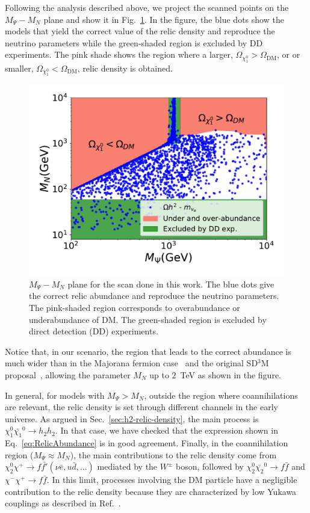 \documentclass[12pt,letterpaper]{article}
\begin{document}
Following the analysis described above, we project the scanned points on the $M_\Psi - M_N$  plane and show it in Fig.~\ref{fig:MSvsMD}. In the figure, the blue dots show the models that yield the correct value of the relic density and reproduce the neutrino parameters while the green-shaded region is excluded by DD experiments. The pink shade shows the region where a larger, $\Omega_{\chi_1^0}>\Omega_{\text{DM}}$, or or smaller, $\Omega_{\chi_1^0}<\Omega_\text{DM}$, relic density is obtained.
\begin{figure}
\centering
\includegraphics[scale=0.5]{MSvsMD}
\caption{$M_{\Psi} - M_N$ plane for the scan done in this work. The blue dots give the correct relic abundance and reproduce the neutrino parameters. The pink-shaded region corresponds to overabundance or underabundance of DM. The green-shaded region is excluded by direct detection (DD) experiments.}
\label{fig:MSvsMD}
\end{figure}
Notice that, in our scenario, the region that leads to the correct abundance is much wider than in the Majorana fermion case~\cite{Cohen:2011ec,Cheung:2013dua,Calibbi:2015nha,Restrepo:2015ura} and the original SD$^3$M proposal~\cite{Yaguna:2015mva}, allowing the parameter $M_N$ up to $2$~TeV as shown in the figure.

In general, for models with $M_\Psi > M_N$,  outside the region where coannihilations are relevant, the relic density is set through different channels in the early universe.   
As argued in Sec.~\ref{sec:h2-relic-density}, the main process is $\chi_1^0\bar{\chi_1}^0\to h_2h_2$. In that case, we have checked that the expression shown in Eq.~\eqref{eq:RelicAbundance} is in good agreement.
Finally, in the coannihilation region  ($M_\Psi\approx M_N$), the main contributions to the relic density come from $\chi_2^0\chi^+ \to f\bar{f'} (\nu\bar{e}, u\bar{d},...)$ mediated by the $W^{\pm}$ boson, followed by $\chi_2^0\bar{\chi_2}^0 \to f\bar{f}$ and $\chi^-\chi^+ \to f\bar{f}$. In this limit, processes involving the DM particle have a negligible contribution to the relic density because they are characterized by low Yukawa couplings as described in Ref.~\cite{Yaguna:2015mva}. 
\end{document}
